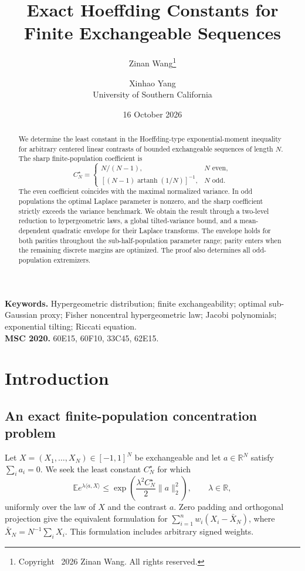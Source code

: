 \documentclass[11pt,a4paper]{article}
\title{\bfseries Exact Hoeffding Constants for Finite Exchangeable Sequences}
\author{Zinan Wang\thanks{Copyright \textcopyright\ 2026 Zinan Wang. All rights reserved.}\and Xinhao Yang\\{\small University of Southern California}}
\date{16 October 2026}
\newcommand{\E}{\mathbb E}\newcommand{\R}{\mathbb R}\newcommand{\N}{\mathbb N}\newcommand{\one}{\mathbf1}
\begin{document}
\maketitle
\begin{abstract}
We determine the least constant in the Hoeffding-type exponential-moment inequality for arbitrary centered linear contrasts of bounded exchangeable sequences of length $N$. The sharp finite-population coefficient is
\[
 C_N^\star=\begin{cases}
 \displaystyle N/(N-1),&N\text{ even},\\[3pt]
 \displaystyle[(N-1)\operatorname{artanh}(1/N)]^{-1},&N\text{ odd}.
 \end{cases}
\]
The even coefficient coincides with the maximal normalized variance. In odd populations the optimal Laplace parameter is nonzero, and the sharp coefficient strictly exceeds the variance benchmark. We obtain the result through a two-level reduction to hypergeometric laws, a global tilted-variance bound, and a mean-dependent quadratic envelope for their Laplace transforms. The envelope holds for both parities throughout the sub-half-population parameter range; parity enters when the remaining discrete margins are optimized. The proof also determines all odd-population extremizers.
\end{abstract}
\noindent\textbf{Keywords.} Hypergeometric distribution; finite exchangeability; optimal sub-Gaussian proxy; Fisher noncentral hypergeometric law; Jacobi polynomials; exponential tilting; Riccati equation.\\
\textbf{MSC 2020.} 60E15, 60F10, 33C45, 62E15.
\section{Introduction}
\subsection{An exact finite-population concentration problem}
Let $X=(X_1,\ldots,X_N)\in[-1,1]^N$ be exchangeable and let $a\in\R^N$ satisfy $\sum_i a_i=0$. We seek the least constant $C_N^\star$ for which
\begin{equation}\label{eq:exchange-intro}
 \E e^{\lambda\langle a,X\rangle}
 \le\exp\left(\frac{\lambda^2C_N^\star}{2}\|a\|_2^2\right),
 \qquad \lambda\in\R,
\end{equation}
uniformly over the law of $X$ and the contrast $a$. Zero padding and orthogonal projection give the equivalent formulation for $\sum_{i=1}^n w_i(X_i-\bar X_N)$, where $\bar X_N=N^{-1}\sum_iX_i$. This formulation includes arbitrary signed weights.
\end{document}
